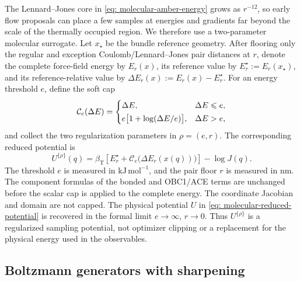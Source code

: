 \documentclass{article}
\begin{document}
The Lennard--Jones core in \eqref{eq: molecular-amber-energy} grows as \(r^{-12}\), so early flow proposals can place a few samples at energies and gradients far beyond the scale of the thermally occupied region. We therefore use a two-parameter molecular surrogate. Let \(x_\star\) be the bundle reference geometry. After flooring only the regular and exception Coulomb/Lennard--Jones pair distances at \(r\), denote the complete force-field energy by \(E_r(x)\), its reference value by \(E_r^\star:=E_r(x_\star)\), and its reference-relative value by \(\Delta E_r(x):=E_r(x)-E_r^\star\). For an energy threshold \(e\), define the soft cap
\begin{equation}
\mathcal C_e(\Delta E)=
\begin{cases}
\Delta E, & \Delta E\leqslant e,\\[2pt]
e\bigl[1+\log(\Delta E/e)\bigr], & \Delta E>e,
\end{cases}
\label{eq: molecular-regularizer}
\end{equation}
and collect the two regularization parameters in \(\rho=(e,r)\). The corresponding reduced potential is
\begin{equation}
U^{\{\rho\}}(q)
=\beta_{\mathrm T}\!\left[E_r^\star
+\mathcal C_e\bigl(\Delta E_r(x(q))\bigr)\right]-\log J(q).
\label{eq: regularized-molecular-potential}
\end{equation}
The threshold \(e\) is measured in \(\mathrm{kJ\,mol^{-1}}\), and the pair floor \(r\) is measured in \(\mathrm{nm}\). The component formulas of the bonded and OBC1/ACE terms are unchanged before the scalar cap is applied to the complete energy. The coordinate Jacobian and domain are not capped. The physical potential \(U\) in \eqref{eq: molecular-reduced-potential} is recovered in the formal limit \(e\to\infty\), \(r\to0\). Thus \(U^{\{\rho\}}\) is a regularized sampling potential, not optimizer clipping or a replacement for the physical energy used in the observables.

\subsection{Boltzmann generators with sharpening}
\label{sec: mol-sharpening}
\end{document}
